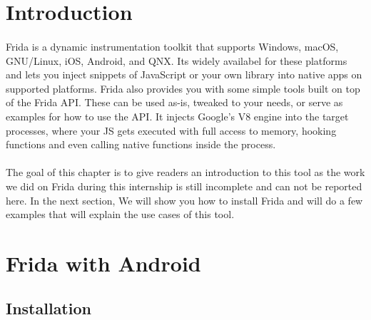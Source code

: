 \documentclass[../main.tex]{subfile}
\begin{document}
	\section{Introduction}
	\paragraph{}  Frida is a dynamic instrumentation toolkit that supports  Windows, macOS, GNU/Linux, iOS, Android, and QNX. Its widely availabel for these platforms and lets you inject snippets of JavaScript or your own library into native apps on supported platforms. Frida also provides you with some simple tools built on top of the Frida API. These can be used as-is, tweaked to your needs, or serve as examples for how to use the API. It injects Google’s V8 engine into the target processes, where your JS gets executed with full access to memory, hooking functions and even calling native functions inside the process. \cite{frida}
	\paragraph{} The goal of this chapter is to give readers an introduction to this tool as the work we did on Frida during this internship is still incomplete and can not be reported here. In the next section, We will show you how to install Frida and will do a few examples that will explain the use cases of this tool.
	\section{Frida with Android}
	\subsection{Installation}
\end{document}
